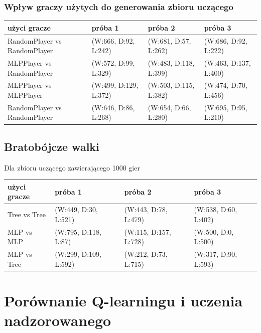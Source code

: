 \documentclass{article}
\begin{document}
\subsubsection{Wpływ graczy użytych do generowania zbioru uczącego}

\begin{center}
  \begin{tabular}{ | l | l | l | l | }
    \hline
    użyci gracze & próba 1 & próba 2 & próba 3 \\ \hline
    RandomPlayer vs RandomPlayer & (W:666, D:92, L:242) & (W:681, D:57, L:262) & (W:686, D:92, L:222) \\ \hline
    MLPPlayer vs RandomPlayer & (W:572, D:99, L:329) & (W:483, D:118, L:399) & (W:463, D:137, L:400) \\ \hline
    MLPPlayer vs MLPPlayer & (W:499, D:129, L:372) & (W:503, D:115, L:382) & (W:474, D:70, L:456) \\ \hline
    RandomPlayer vs RandomPlayer & (W:646, D:86, L:268) & (W:654, D:66, L:280) & (W:695, D:95, L:210) \\ \hline
  \end{tabular}
\end{center}

\subsection{Bratobójcze walki}

Dla zbioru uczącego zawierającego 1000 gier

\begin{center}
  \begin{tabular}{ | l | l | l | l | }
    \hline
    użyci gracze & próba 1 & próba 2 & próba 3 \\ \hline
    Tree vs Tree & (W:449, D:30, L:521) & (W:443, D:78, L:479) & (W:538, D:60, L:402) \\ \hline
    MLP vs MLP & (W:795, D:118, L:87) & (W:115, D:157, L:728) & (W:500, D:0, L:500) \\ \hline
    MLP vs Tree & (W:299, D:109, L:592) & (W:212, D:73, L:715) & (W:317, D:90, L:593) \\ \hline
  \end{tabular}
\end{center}


\section{Porównanie Q-learningu i uczenia nadzorowanego}
\end{document}
